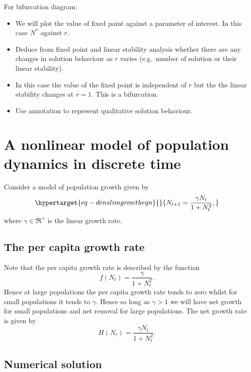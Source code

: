 \documentclass[
  letterpaper,
  DIV=11,
  numbers=noendperiod]{scrreprt}
\providecommand{\tightlist}{%
  \setlength{\itemsep}{0pt}\setlength{\parskip}{0pt}}\usepackage{longtable,booktabs,array}
\begin{document}
For bifurcation diagram:

\begin{itemize}
\tightlist
\item
  We will plot the value of fixed point against a parameter of interest.
  In this case \(N^*\) against \(r\).
\item
  Deduce from fixed point and linear stability analysis whether there
  are any changes in solution behaviour as \(r\) varies (e.g.~number of
  solution or their linear stability).
\item
  In this case the value of the fixed point is independent of \(r\) but
  the the linear stability changes at \(r=1\). This is a bifurcation.
\item
  Use annotation to represent qualitative solution behaviour.
\end{itemize}

\hypertarget{a-nonlinear-model-of-population-dynamics-in-discrete-time}{%
\section{A nonlinear model of population dynamics in discrete
time}\label{a-nonlinear-model-of-population-dynamics-in-discrete-time}}

Consider a model of population growth given by
\begin{equation}\protect\hypertarget{eq-denslimgrowtheqn}{}{
N_{t+1}=\frac{\gamma N_t}{1+N_t^2},
}\label{eq-denslimgrowtheqn}\end{equation} where \(\gamma\in \Re^+\) is
the linear growth rate.

\hypertarget{the-per-capita-growth-rate}{%
\subsection{The per capita growth
rate}\label{the-per-capita-growth-rate}}

Note that the per capita growth rate is described by the function \[
f(N_{t})=\frac{\gamma}{1+N_t^2}.
\] Hence at large populations the per capita growth rate tends to zero
whilst for small populations it tends to \(\gamma\). Hence so long as
\(\gamma>1\) we will have net growth for small populations and net
removal for large populations. The net growth rate is given by \[
H(N_{t})=\frac{\gamma N_t}{1+N_t^2}.
\]

\hypertarget{numerical-solution}{%
\subsection{Numerical solution}\label{numerical-solution}}
\end{document}

